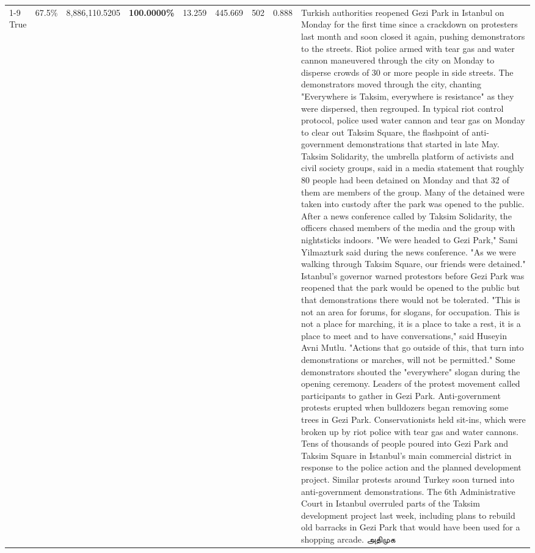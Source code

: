 \begin{table}[H]
\begin{tabular}{lllrlllll}
\cline{1-9}
True & 67.5\% & 8,886,110.5205 & \bfseries \color{red} 100.0000\% & 13.259 & 445.669 & 502 & 0.888 & Turkish authorities reopened Gezi Park in Istanbul on Monday for the first time since a crackdown on protesters last month and soon closed it again, pushing demonstrators to the streets. Riot police armed with tear gas and water cannon maneuvered through the city on Monday to disperse crowds of 30 or more people in side streets. The demonstrators moved through the city, chanting "Everywhere is Taksim, everywhere is resistance" as they were dispersed, then regrouped. In typical riot control protocol, police used water cannon and tear gas on Monday to clear out Taksim Square, the flashpoint of anti-government demonstrations that started in late May. Taksim Solidarity, the umbrella platform of activists and civil society groups, said in a media statement that roughly 80 people had been detained on Monday and that 32 of them are members of the group. Many of the detained were taken into custody after the park was opened to the public. After a news conference called by Taksim Solidarity, the officers chased members of the media and the group with nightsticks indoors. "We were headed to Gezi Park," Sami Yilmazturk said during the news conference. "As we were walking through Taksim Square, our friends were detained." Istanbul's governor warned protestors before Gezi Park was reopened that the park would be opened to the public but that demonstrations there would not be tolerated. "This is not an area for forums, for slogans, for occupation. This is not a place for marching, it is a place to take a rest, it is a place to meet and to have conversations," said Huseyin Avni Mutlu. "Actions that go outside of this, that turn into demonstrations or marches, will not be permitted." Some demonstrators shouted the "everywhere" slogan during the opening ceremony. Leaders of the protest movement called participants to gather in Gezi Park. Anti-government protests erupted when bulldozers began removing some trees in Gezi Park. Conservationists held sit-ins, which were broken up by riot police with tear gas and water cannons. Tens of thousands of people poured into Gezi Park and Taksim Square in Istanbul's main commercial district in response to the police action and the planned development project. Similar protests around Turkey soon turned into anti-government demonstrations. The 6th Administrative Court in Istanbul overruled parts of the Taksim development project last week, including plans to rebuild old barracks in Gezi Park that would have been used for a shopping arcade. அதிமுக \\

\end{tabular}
\end{table}
